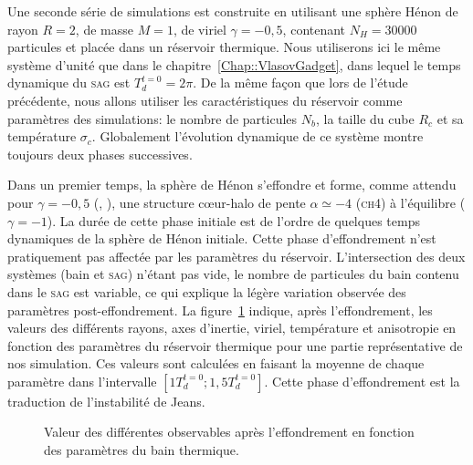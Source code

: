 	Une seconde série de simulations est construite en utilisant une sphère Hénon de rayon $R=2$, de masse $M=1$, de viriel $\gamma=-0,5$,
	contenant $N_H = 30000$ particules et placée dans un réservoir thermique. Nous utiliserons ici le même système d'unité que dans le
	chapitre~\ref{Chap::VlasovGadget}, dans lequel le temps dynamique du \textsc{sag} est $T_d^{t=0} = 2\pi$. De la même façon que lors de l'étude
	précédente, nous allons utiliser les caractéristiques du réservoir comme paramètres des simulations: le nombre de particules $N_b$, la taille
	du cube $R_c$ et sa température $\sigma_c$. Globalement l'évolution dynamique de ce système montre toujours deux phases successives.

	Dans un premier temps, la sphère de Hénon s'effondre et forme, comme attendu pour $\gamma=-0,5$ (\citet{roy}, \citet{Joyceetal}), une
	structure cœur-halo de pente $\alpha\simeq-4$ (\textsc{ch4}) à l'équilibre ($\gamma=-1$). La durée de cette phase initiale est de l'ordre de
	quelques temps dynamiques de la sphère de Hénon initiale. Cette phase d'effondrement n'est pratiquement pas affectée par les paramètres du
	réservoir. L'intersection des deux systèmes (bain et \textsc{sag}) n'étant pas vide, le nombre de particules du bain contenu dans le
	\textsc{sag} est variable, ce qui explique la légère variation observée des paramètres post-effondrement. La
	figure~\ref{Fig::Simu::EvoParamPostCollapse} indique, après l'effondrement, les valeurs des différents rayons, axes d'inertie, viriel,
	température et anisotropie en fonction des paramètres du réservoir thermique pour une partie représentative de nos simulation. Ces valeurs
	sont calculées en faisant la moyenne de chaque paramètre dans l'intervalle $[1T_d^{t=0}; 1,5T_d^{t=0}]$. Cette phase d'effondrement est la
	traduction de l'instabilité de Jeans.
	\begin{figure}[htbp]
		\centering {}
		\caption{Valeur des différentes observables après l'effondrement en fonction des paramètres du bain thermique.\label{Fig::Simu::EvoParamPostCollapse}}
	\end{figure}

